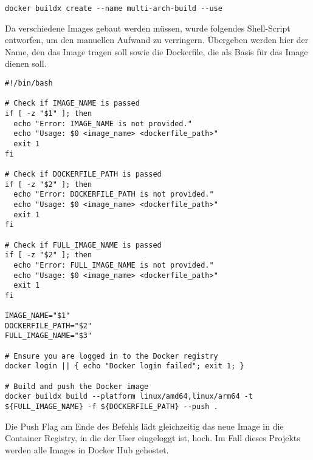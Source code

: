 \vspace{1em}
\begin{lstlisting}[label={lst:lst-shell-buildx-setup}]
docker buildx create --name multi-arch-build --use
\end{lstlisting}
\vspace{1em}

Da verschiedene Images gebaut werden müssen, wurde folgendes Shell-Script entworfen, um den manuellen Aufwand zu verringern.
Übergeben werden hier der Name, den das Image tragen soll sowie die Dockerfile, die als Basis für das Image dienen soll.

\vspace{1em}
\begin{lstlisting}[label={lst:lst-shell-buildx-build}]
#!/bin/bash

# Check if IMAGE_NAME is passed
if [ -z "$1" ]; then
  echo "Error: IMAGE_NAME is not provided."
  echo "Usage: $0 <image_name> <dockerfile_path>"
  exit 1
fi

# Check if DOCKERFILE_PATH is passed
if [ -z "$2" ]; then
  echo "Error: DOCKERFILE_PATH is not provided."
  echo "Usage: $0 <image_name> <dockerfile_path>"
  exit 1
fi

# Check if FULL_IMAGE_NAME is passed
if [ -z "$2" ]; then
  echo "Error: FULL_IMAGE_NAME is not provided."
  echo "Usage: $0 <image_name> <dockerfile_path>"
  exit 1
fi

IMAGE_NAME="$1"
DOCKERFILE_PATH="$2"
FULL_IMAGE_NAME="$3"

# Ensure you are logged in to the Docker registry
docker login || { echo "Docker login failed"; exit 1; }

# Build and push the Docker image
docker buildx build --platform linux/amd64,linux/arm64 -t ${FULL_IMAGE_NAME} -f ${DOCKERFILE_PATH} --push .
\end{lstlisting}
\vspace{1em}

Die Push Flag am Ende des Befehls lädt gleichzeitig das neue Image in die Container Registry, in die der User eingeloggt ist, hoch.
Im Fall dieses Projekts werden alle Images in Docker Hub gehostet.


